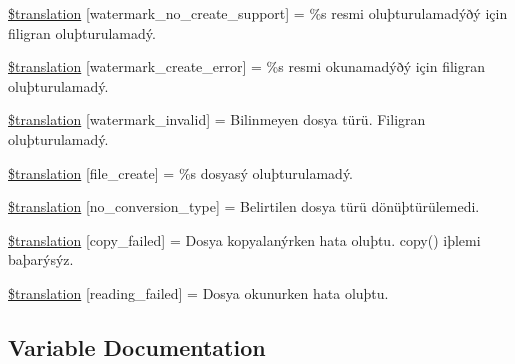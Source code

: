 \begin{DoxyCompactItemize}
\hyperlink{class_8upload_8tr___t_r_8php_a82d5853430ab72dc1f9799ec36144cc6}{\$translation} \mbox{[}\textquotesingle{}watermark\+\_\+no\+\_\+create\+\_\+support\textquotesingle{}\mbox{]} = \textquotesingle{}\%s resmi oluþturulamadýðý için filigran oluþturulamadý.\textquotesingle{}
\item 
\hyperlink{class_8upload_8tr___t_r_8php_aabca0b65dadbc6184415c16375f284ca}{\$translation} \mbox{[}\textquotesingle{}watermark\+\_\+create\+\_\+error\textquotesingle{}\mbox{]} = \textquotesingle{}\%s resmi okunamadýðý için filigran oluþturulamadý.\textquotesingle{}
\item 
\hyperlink{class_8upload_8tr___t_r_8php_ac336e7a5701e47ba4a05e9e498a3cc44}{\$translation} \mbox{[}\textquotesingle{}watermark\+\_\+invalid\textquotesingle{}\mbox{]} = \textquotesingle{}Bilinmeyen dosya türü. Filigran oluþturulamadý.\textquotesingle{}
\item 
\hyperlink{class_8upload_8tr___t_r_8php_a1ecb4673e4fb69e06b3f20b65cecf30a}{\$translation} \mbox{[}\textquotesingle{}file\+\_\+create\textquotesingle{}\mbox{]} = \textquotesingle{}\%s dosyasý oluþturulamadý.\textquotesingle{}
\item 
\hyperlink{class_8upload_8tr___t_r_8php_a4712d7ec28e9a7f17eb3338af2358363}{\$translation} \mbox{[}\textquotesingle{}no\+\_\+conversion\+\_\+type\textquotesingle{}\mbox{]} = \textquotesingle{}Belirtilen dosya türü dönüþtürülemedi.\textquotesingle{}
\item 
\hyperlink{class_8upload_8tr___t_r_8php_a783c9358bcf54a054545b50098bc679b}{\$translation} \mbox{[}\textquotesingle{}copy\+\_\+failed\textquotesingle{}\mbox{]} = \textquotesingle{}Dosya kopyalanýrken hata oluþtu. copy() iþlemi baþarýsýz.\textquotesingle{}
\item 
\hyperlink{class_8upload_8tr___t_r_8php_a01bea14c9fd5f353f62db44beabfcd42}{\$translation} \mbox{[}\textquotesingle{}reading\+\_\+failed\textquotesingle{}\mbox{]} = \textquotesingle{}Dosya okunurken hata oluþtu.\textquotesingle{}
\end{DoxyCompactItemize}


\subsection{Variable Documentation}
\hypertarget{class_8upload_8tr___t_r_8php_a1f198d410fecc3871ebdd468d343a5e3}{}
